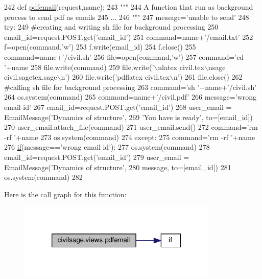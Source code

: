 \begin{DoxyCode}
242 \textcolor{keyword}{def }\hyperlink{namespacecivilsage_1_1views_a9914ff19f8e15ccab1a07eaeac8cfb21}{pdfemail}(request,name):
243     \textcolor{stringliteral}{"""}
244 \textcolor{stringliteral}{    A function that run as background process to send pdf as emails}
245 \textcolor{stringliteral}{    ...}
246 \textcolor{stringliteral}{    """}
247     message=\textcolor{stringliteral}{'unable to send'}
248     \textcolor{keywordflow}{try}:
249         \textcolor{comment}{#creating and writing sh file for background processing}
250         email\_id=request.POST.get(\textcolor{stringliteral}{'email\_id'})
251         command=name+\textcolor{stringliteral}{'/email.txt'}
252         f=open(command,\textcolor{stringliteral}{'w'})
253         f.write(email\_id)
254         f.close()
255         command=name+\textcolor{stringliteral}{'/civil.sh'}
256         file=open(command,\textcolor{stringliteral}{'w'})
257         command=\textcolor{stringliteral}{'cd '}+name
258         file.write(command)
259         file.write(\textcolor{stringliteral}{'\(\backslash\)nlatex civil.tex\(\backslash\)nsage civil.sagetex.sage\(\backslash\)n'})
260         file.write(\textcolor{stringliteral}{'pdflatex civil.tex\(\backslash\)n'})
261         file.close()
262         \textcolor{comment}{#calling sh file for background processing}
263         command=\textcolor{stringliteral}{'sh '}+name+\textcolor{stringliteral}{'/civil.sh'}
264         os.system(command)
265         command=name+\textcolor{stringliteral}{'/civil.pdf'}
266         message=\textcolor{stringliteral}{'wrong email id'}
267         email\_id=request.POST.get(\textcolor{stringliteral}{'email\_id'})
268         user\_email = EmailMessage(\textcolor{stringliteral}{'Dynamics of structure'},
269         \textcolor{stringliteral}{'You have is ready'}, to=[email\_id])
270         user\_email.attach\_file(command)
271         user\_email.send()
272         command=\textcolor{stringliteral}{'rm -rf '}+name
273         os.system(command)
274     \textcolor{keywordflow}{except}:
275         command=\textcolor{stringliteral}{'rm -rf '}+name
276         \hyperlink{bootstrap_8min_8js_ac2d69f5011896c6ed4a54e0dd36f6334}{if}(message==\textcolor{stringliteral}{'wrong email id'}):
277             os.system(command)
278         email\_id=request.POST.get(\textcolor{stringliteral}{'email\_id'})
279         user\_email = EmailMessage(\textcolor{stringliteral}{'Dynamics of structure'},
280         message, to=[email\_id])
281         os.system(command)
282 
\end{DoxyCode}


Here is the call graph for this function\+:\nopagebreak
\begin{figure}[H]
\begin{center}
\leavevmode
\includegraphics[width=270pt]{namespacecivilsage_1_1views_a9914ff19f8e15ccab1a07eaeac8cfb21_cgraph}
\end{center}
\end{figure}


